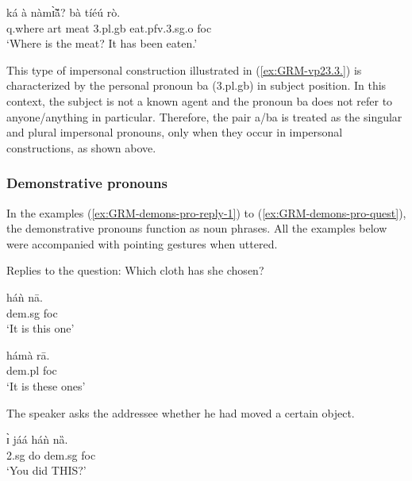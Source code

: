 \begin{exe}
\begin{exe}
\begin{exe}
{\begin{exe}
\begin{exe}
\begin{exe}
\begin{exe}
\begin{exe}
\begin{exe}
\begin{exe}
\ea\label{ex:GRM-vp23.3.}
\gll ká à nàmɪ̃̀ã́?  bà tíéú rò.\\
   {\sc q}.where {\sc art} meat {\sc 3.pl.g}b  eat.{\sc pfv}.{\sc 3.sg.o} 
{\sc
foc}\\
\glt  `Where is the meat? It has been eaten.'
\z


This type of impersonal
construction illustrated in  (\ref{ex:GRM-vp23.3.})  is characterized by the
personal pronoun {\sls ba} ({\sc 3.pl.g}b)  in
subject position. In this context,  the subject is not a known agent and the 
pronoun {\sls ba} does not refer to anyone/anything in 
particular. Therefore,  the pair {\sls a}/{\sls ba} is treated  as the singular 
and
plural impersonal pronouns, only when they occur in impersonal constructions, 
as shown above.






\subsubsection{Demonstrative pronouns}
\label{sec:GRM-demons-pro}


In the examples (\ref{ex:GRM-demons-pro-reply-1}) to
(\ref{ex:GRM-demons-pro-quest}),  the demonstrative pronouns  
function as noun phrases. All the examples below were accompanied with
 pointing gestures when uttered.



\ea\label{ex:GRM-demons-pro-reply-1}{\rm Replies to the question: Which cloth
has she chosen?}
 
 
  \ea\label{ex:GRM-demons-pro-reply-1sg} 
 \gll háǹ nā.\\
   {\sc dem.sg} {\sc foc}\\
 \glt `It is this one' 
   
   \ex\label{ex:GRM-demons-pro-reply-1pl}
    \gll hámà rā.\\
   {\sc dem.pl} {\sc foc}\\
 \glt `It is these ones' 
 
\z 
 \z



\ea\label{ex:GRM-demons-pro-quest}{\rm The speaker asks the addressee whether 
he had moved a certain object.} 

 \gll   ɪ̀ jáá háǹ nȁ.\\
  {\sc 2.sg} do {\sc dem.sg}  {\sc foc}\\
 \glt `You did THIS?' 

\z



\end{exe}
\end{exe}
\end{exe}
\end{exe}
\end{exe}
\end{exe}
\end{exe}}
\end{exe}
\end{exe}
\end{exe}
